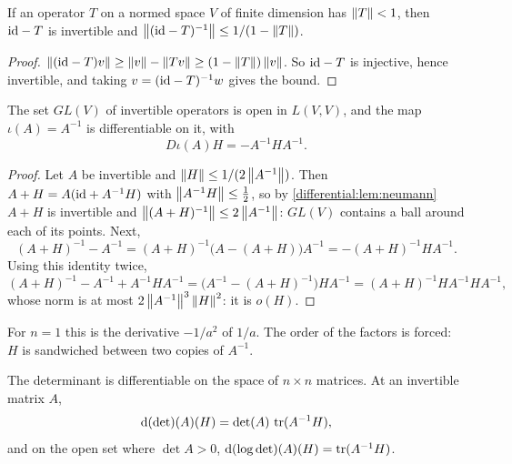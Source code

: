\begin{notechapter}
\begin{lemma}\label{differential:lem:neumann}
If an operator $T$ on a normed space $V$ of finite dimension has
$\left\|T\right\| < 1$, then $\mathrm{id} - T$ is invertible and
$\left\|(\mathrm{id} - T)^{-1}\right\|\leq1/(1 - \left\|T\right\|)$.
\end{lemma}

\begin{proof}
$\left\|(\mathrm{id} - T)v\right\|\geq\left\|v\right\| - \left\|Tv\right\|\geq(1 - \left\|T\right\|)\left\|v\right\|$. So
$\mathrm{id} - T$ is injective, hence invertible, and taking
$v = (\mathrm{id} - T)^{-1}w$ gives the bound.
\end{proof}

\begin{proposition}\label{differential:prop:inverse}
The set $GL(V)$ of invertible operators is open in $L(V, V)$, and the map
$\iota(A) = A^{-1}$ is differentiable on it, with
\[
  D\iota(A)H = -A^{-1}HA^{-1} .
\]
\end{proposition}

\begin{proof}
Let $A$ be invertible and $\left\|H\right\|\leq1/(2\left\|A^{-1}\right\|)$. Then
$A + H = A(\mathrm{id} + A^{-1}H)$ with $\left\|A^{-1}H\right\|\leq\frac12$, so by
\cref{differential:lem:neumann} $A + H$ is invertible and
$\left\|(A + H)^{-1}\right\|\leq2\left\|A^{-1}\right\|$: $GL(V)$ contains a ball around
each of its points. Next,
\[
  (A + H)^{-1} - A^{-1}
  = (A + H)^{-1}\bigl(A - (A + H)\bigr)A^{-1}
  = -(A + H)^{-1}HA^{-1} .
\]
Using this identity twice,
\[
  (A + H)^{-1} - A^{-1} + A^{-1}HA^{-1}
  = \bigl(A^{-1} - (A + H)^{-1}\bigr)HA^{-1}
  = (A + H)^{-1}HA^{-1}HA^{-1} ,
\]
whose norm is at most $2\left\|A^{-1}\right\|^3\left\|H\right\|^2$: it is $o(H)$.
\end{proof}

For $n = 1$ this is the derivative $-1/a^2$ of $1/a$. The order of the
factors is forced: $H$ is sandwiched between two copies of $A^{-1}$.

\begin{proposition}\label{differential:prop:det}
The determinant is differentiable on the space of $n\times n$ matrices.
At an invertible matrix $A$,
\[
  \mathrm{d}(\det)(A)(H) = \det(A)\,\operatorname{tr}(A^{-1}H) ,
\]
and on the open set where $\det A > 0$,
$\mathrm{d}(\log\det)(A)(H) = \operatorname{tr}(A^{-1}H)$.
\end{proposition}


\end{notechapter}

